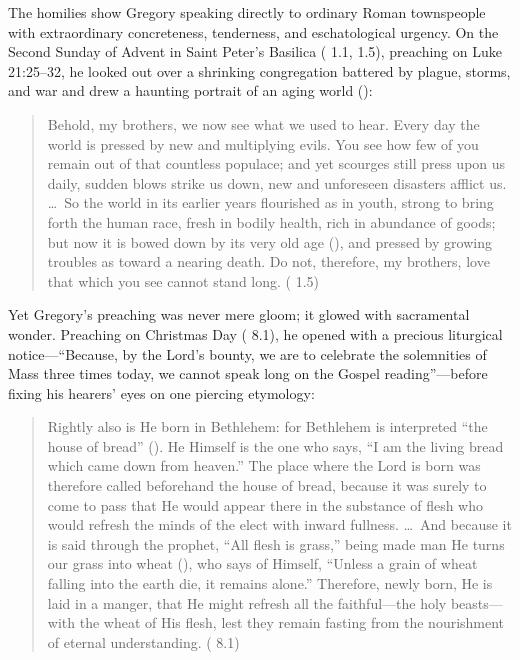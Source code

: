 The homilies show Gregory speaking directly to ordinary Roman townspeople with
extraordinary concreteness, tenderness, and eschatological urgency. On the
Second Sunday of Advent in Saint Peter's Basilica ( 1.1, 1.5), preaching on Luke 21:25--32, he looked out over a
shrinking congregation battered by plague, storms, and war and drew a haunting
portrait of an aging world ():

\begin{quote}
Behold, my brothers, we now see what we used to hear. Every day the world is
pressed by new and multiplying evils. You see how few of you remain out of that
countless populace; and yet scourges still press upon us daily, sudden blows
strike us down, new and unforeseen disasters afflict us. \dots\ So the world in
its earlier years flourished as in youth, strong to bring forth the human race,
fresh in bodily health, rich in abundance of goods; but now it is bowed down by
its very old age (), and pressed by
growing troubles as toward a nearing death. Do not, therefore, my brothers,
love that which you see cannot stand long. ( 1.5)
\end{quote}

Yet Gregory's preaching was never mere gloom; it glowed with sacramental
wonder. Preaching on Christmas Day ( 8.1), he
opened with a precious liturgical notice---``Because, by the Lord's bounty, we
are to celebrate the solemnities of Mass three times today, we cannot speak
long on the Gospel reading''---before fixing his hearers' eyes on one piercing
etymology:

\begin{quote}
Rightly also is He born in Bethlehem: for Bethlehem is interpreted ``the house
of bread'' (). He Himself is the one who says, ``I am the
living bread which came down from heaven.'' The place where the Lord is born
was therefore called beforehand the house of bread, because it was surely to
come to pass that He would appear there in the substance of flesh who would
refresh the minds of the elect with inward fullness. \dots\ And because it is
said through the prophet, ``All flesh is grass,'' being made man He turns our
grass into wheat (), who says of
Himself, ``Unless a grain of wheat falling into the earth die, it remains
alone.'' Therefore, newly born, He is laid in a manger, that He might refresh
all the faithful---the holy beasts---with the wheat of His flesh, lest they
remain fasting from the nourishment of eternal understanding. ( 8.1)
\end{quote}

